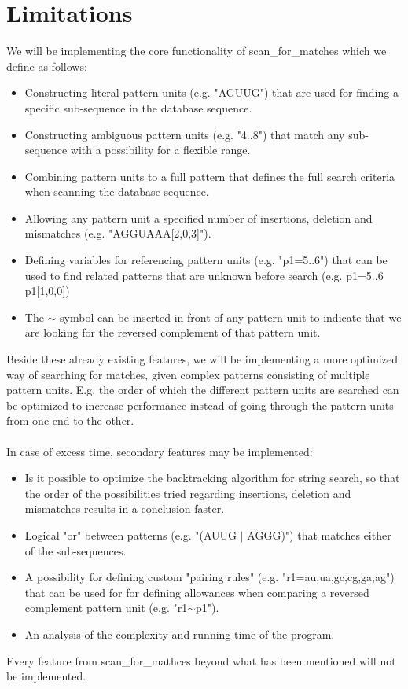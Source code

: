 \documentclass[12pt]{article}
\begin{document}
\section{Limitations}
We will be implementing the core functionality of scan\_for\_matches which we define as follows:
\begin{itemize}
\item Constructing literal pattern units (e.g. "AGUUG") that are used for finding a specific sub-sequence in the 
database sequence.
\item Constructing ambiguous pattern units (e.g. "4..8") that match any sub-sequence with a possibility for a 
flexible range.
\item Combining pattern units to a full pattern that defines the full search criteria when scanning the database sequence.
\item Allowing any pattern unit a specified number of insertions, deletion and mismatches (e.g. "AGGUAAA[2,0,3]").
\item Defining variables for referencing pattern units (e.g. "p1=5..6") that can be used 
to find related patterns that are unknown before search (e.g. p1=5..6 p1[1,0,0])
\item The $\sim$ symbol can be inserted in front of any pattern unit to indicate that we are looking for the reversed
complement of that pattern unit.
\end{itemize}
Beside these already existing features, we will be implementing a more optimized way of searching for matches, given
complex patterns consisting of multiple pattern units. E.g. the order of which the different pattern units are searched
can be optimized to increase performance instead of going through the pattern units from one end to the other. \\ \\
In case of excess time, secondary features may be implemented: 
\begin{itemize}
\item Is it possible to optimize the backtracking algorithm for string search, so that the order of the possibilities 
tried regarding insertions, deletion and mismatches results in a conclusion faster.
\item Logical "or" between patterns (e.g. "(AUUG $|$ AGGG)") that matches either of the sub-sequences.
\item A possibility for defining custom "pairing rules" (e.g. "r1={au,ua,gc,cg,ga,ag}") that can be used for 
for defining allowances when comparing a reversed complement pattern unit (e.g. "r1$\sim$p1").
\item An analysis of the complexity and running time of the program.
\end{itemize}
Every feature from scan\_for\_mathces beyond what has been mentioned will not be implemented.
\end{document}
